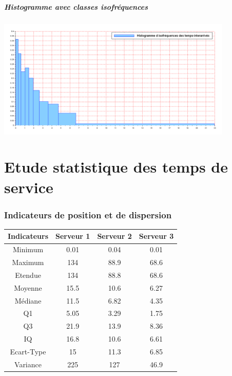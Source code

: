 \documentclass{article}
\begin{document}
\subsubsection{Histogramme avec classes isofréquences}
\begin{center}
\includegraphics[width=425px]{img/H_isof.png}
\end{center}
\paragraph{}

\part{Etude statistique des temps de service}

\section{Indicateurs de position et de dispersion}

\begin{tabular}{|c|c|c|c|}
  \hline
  Indicateurs & Serveur 1 & Serveur 2 & Serveur 3 \\
  \hline
  Minimum & 0.01 & 0.04 & 0.01 \\
  Maximum & 134 & 88.9 & 68.6 \\
  Etendue & 134 & 88.8 & 68.6 \\
  \hline
  Moyenne & 15.5 & 10.6 & 6.27 \\
  Médiane & 11.5 & 6.82 & 4.35 \\
  \hline
  Q1 & 5.05 & 3.29 & 1.75 \\
  Q3 & 21.9 & 13.9 & 8.36 \\
  IQ & 16.8 & 10.6 & 6.61 \\
  \hline
  Ecart-Type & 15 & 11.3 & 6.85 \\
  Variance & 225 & 127 & 46.9 \\
  \hline
\end{tabular}
\end{document}
